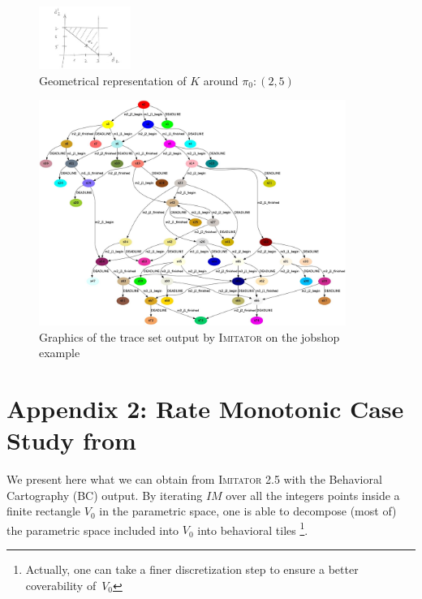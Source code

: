 \documentclass{llncs}
\newcommand{\Ko}{K}
\newcommand{\pio}{\pi_0}
\newcommand{\IM}{\mathit{IM}}
\newcommand{\imitator}{\textsc{Imitator}}
\newcommand{\commentaire}[1]{\textcolor{red}{\textbf{$\Leftarrow$  #1 $\Rightarrow$}}}
\begin{document}
\begin{figure}[ht!]
	\centering
 		\includegraphics[width=3cm]{./figures/geom.jpg}
	\caption{Geometrical representation of $\Ko$ around $\pio: (2,5)$}
	\label{fig:geom}
\end{figure}

\begin{figure}[ht!]
	\centering
 		\includegraphics[width=10cm]{./figures/traceset.jpg}
	\caption{Graphics of the trace set output by \imitator{} on the jobshop example}
	\label{fig:output}
\end{figure}




\section*{Appendix 2: Rate Monotonic Case Study from \cite{bb04}}
\label{app:carto}
We present here what we can obtain from \imitator{} 2.5 with the Behavioral Cartography (BC) output. By iterating $\IM$ over all the integers points inside a finite rectangle $V_0$ in the parametric space,
 one is able to decompose
(most of) the parametric space included into $V_0$ into behavioral tiles
\footnote{Actually, one can take a finer discretization step to ensure a better coverability of~$V_0$}.
\end{document}
